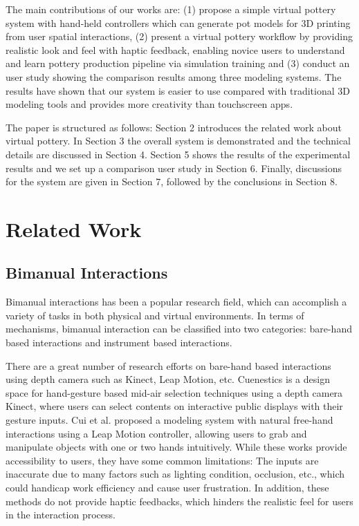 \documentclass{svjour3}                     %
\begin{document}
The main contributions of our works are:
%
(1) propose a simple virtual pottery system with hand-held controllers which can generate pot models for 3D printing from user spatial interactions,
%
(2) present a virtual pottery workflow by providing realistic look and feel with haptic feedback, enabling novice users to understand and learn pottery production pipeline via simulation training 
%
and (3) conduct an user study showing the comparison results among three modeling systems. The results have shown that our system is easier to use compared with traditional 3D modeling tools and provides more creativity than touchscreen apps.

The paper is structured as follows:
Section 2 introduces the related work about virtual pottery.
In Section 3 the overall system is demonstrated and the technical details are discussed in Section 4.
Section 5 shows the results of the experimental results and we set up a comparison user study in Section 6.
Finally, discussions for the system are given in Section 7, followed by the conclusions in Section 8.

\section{Related Work}
\label{sec:2}

\subsection{Bimanual Interactions}
\label{sec:2.1}
Bimanual interactions has been a popular research field, which can accomplish a variety of tasks in both physical and virtual environments.
In terms of mechanisms, bimanual interaction can be classified into two categories: bare-hand based interactions and instrument based interactions.

There are a great number of research efforts \cite{walter2014cuenesics,cui2016exploration,ramani2015gesture,murugappan2013handy,han2014virtual} on bare-hand based interactions using depth camera such as Kinect, Leap Motion, etc.
Cuenestics \cite{walter2014cuenesics} is a design space for hand-gesture based mid-air selection techniques using a depth camera Kinect, where users can select contents on interactive public displays with their gesture inputs.
Cui et al. \cite{cui2016exploration} proposed a modeling system with natural free-hand interactions using a Leap Motion controller, allowing users to grab and manipulate objects with one or two hands intuitively.
While these works provide accessibility to users, they have some common limitations: The inputs are inaccurate due to many factors such as lighting condition, occlusion, etc., which could handicap work efficiency and cause user frustration.
In addition, these methods do not provide haptic feedbacks, which hinders the realistic feel for users in the interaction process.
\end{document}
